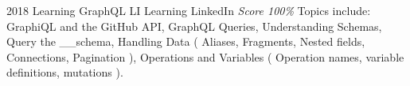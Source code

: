 \documentclass[11pt,a4paper]{moderncv}
\begin{document}
\cventry
    {2018}
    {Learning GraphQL}
    {LI Learning}
    {LinkedIn}
    {\textit{Score 100\%}}
    {
        Topics include:                                                          %
            GraphiQL and the GitHub API,                                                          %
            GraphQL Queries,                                                          %
            Understanding Schemas,                                                          %
            Query the \_\_schema,                                                          %
            Handling Data (                                                          %
                Aliases,                                                          %
                Fragments,                                                          %
                Nested fields,                                                          %
                Connections,                                                          %
                Pagination                                                          %
            ),                                                          %
            Operations and Variables (                                                          %
                Operation names,                                                          %
                variable definitions,                                                          %
                mutations                                                          %
            ).                                                          %
    }
\end{document}
